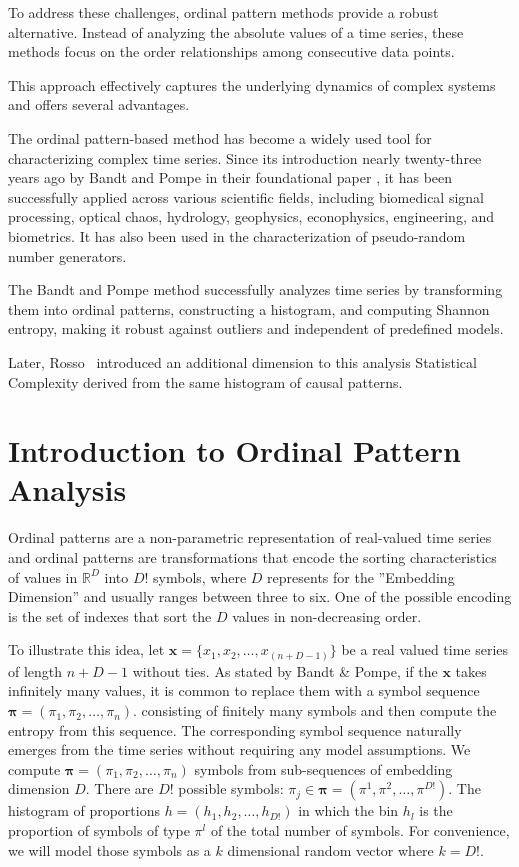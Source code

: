 To address these challenges, ordinal pattern methods provide a robust alternative. Instead of analyzing the absolute values of a time series, these methods focus on the order relationships among consecutive data points.

This approach effectively captures the underlying dynamics of complex systems and offers several advantages.

The ordinal pattern-based method has become a widely used tool for characterizing complex time series. Since its introduction nearly twenty-three years ago by Bandt and Pompe in their foundational paper \cite{PhysRevLett.88.174102}, it has been successfully applied across various scientific fields, including biomedical signal processing, optical chaos, hydrology, geophysics, econophysics, engineering, and biometrics. It has also been used in the characterization of pseudo-random number generators.
   
The Bandt and Pompe method successfully analyzes time series by transforming them into ordinal patterns, constructing a histogram, and computing Shannon entropy, making it robust against outliers and independent of predefined models.

Later, Rosso~\cite{Rosso2007} introduced an additional dimension to this analysis Statistical Complexity derived from the same histogram of causal patterns.

\section*{Introduction to Ordinal Pattern Analysis}

Ordinal patterns are a non-parametric representation of real-valued time series and ordinal patterns are transformations that encode the sorting characteristics of values in $\mathbb{R}^D$ into $D!$ symbols, where $D$ represents for the ''Embedding Dimension'' and usually ranges between three to six. 
One of the possible encoding is the set of indexes that sort the $D$ values in non-decreasing order.
 

To illustrate this idea, let $\bm{x}=\{x_1,x_2, \dots, x_{(n+D-1)}\}$ 
be a real valued time series of length $n+D-1$ without ties. 
As stated by Bandt \& Pompe, if the $\bm{x}$ takes infinitely many values, it is common to replace them with a symbol sequence $\bm{{\pi}}=({\pi}_1, {\pi}_2,\dots, {\pi}_n)$.
consisting of finitely many symbols and then compute the entropy from this sequence. 
The corresponding symbol sequence naturally emerges from the time series without requiring any model assumptions. We compute
$\bm{{\pi}}=({\pi}_1, {\pi}_2,\dots, {\pi}_n)$ symbols from sub-sequences of embedding dimension $D$. 
There are $D!$ possible symbols: $\pi_j \in \bm{{\pi}}=({\pi}^1, {\pi}^2,\dots, {\pi}^{D!})$. 
The histogram of proportions $h=(h_1,h_2,\dots, h_{D!})$ in which the bin $h_l$ 
is the proportion of symbols of type $\pi^l$ of the total number of symbols. 
For convenience, we will model those symbols as a $k$ dimensional random vector where $k=D!$.

